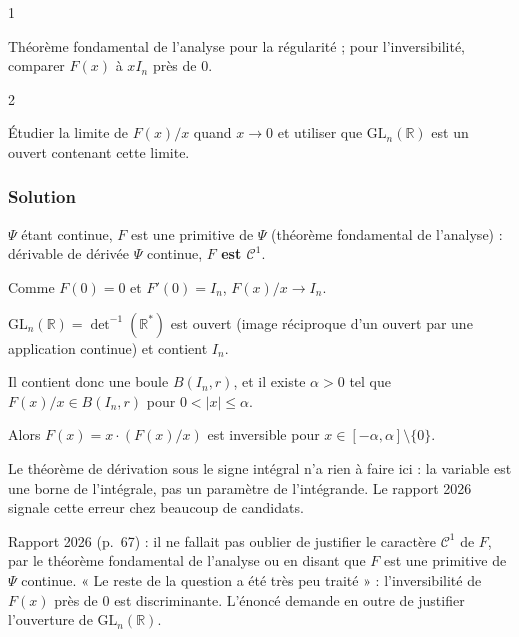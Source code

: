 \documentclass[11pt,a4paper]{article}
\begin{document}
\begin{indication}{1}

Théorème fondamental de l'analyse pour la régularité ; pour l'inversibilité, comparer \(F(x)\) à \(xI_n\) près de 0.

\end{indication}

\begin{indication}{2}

Étudier la limite de \(F(x)/x\) quand \(x\to0\) et utiliser que \({\mathrm{GL}}_n(\mathbb{R})\) est un ouvert contenant cette limite.

\end{indication}

\hypertarget{solution-20}{%
\subsubsection{Solution}\label{solution-20}}

\(\Psi\) étant continue, \(F\) est une primitive de \(\Psi\) (théorème fondamental de l'analyse) : dérivable de dérivée \(\Psi\) continue, \textbf{\(F\) est \({\mathcal{C}}^1\)}.

Comme \(F(0)=0\) et \(F'(0)=I_n\), \(F(x)/x\to I_n\).

\({\mathrm{GL}}_n(\mathbb{R})=\det^{-1}({\mathbb{R}}^*)\) est ouvert (image réciproque d'un ouvert par une application continue) et contient \(I_n\).

Il contient donc une boule \(B(I_n,r)\), et il existe \(\alpha>0\) tel que \(F(x)/x\in B(I_n,r)\) pour \(0<|x|\le\alpha\).

Alors \(F(x)=x\cdot(F(x)/x)\) est inversible pour \(x\in[-\alpha,\alpha]\setminus\{0\}\).

\begin{piege}

Le théorème de dérivation sous le signe intégral n'a rien à faire ici : la variable est une borne de l'intégrale, pas un paramètre de l'intégrande. Le rapport 2026 signale cette erreur chez beaucoup de candidats.

\end{piege}

\begin{jury}

Rapport 2026 (p.~67) : il ne fallait pas oublier de justifier le caractère \({\mathcal{C}}^1\) de \(F\), par le théorème fondamental de l'analyse ou en disant que \(F\) est une primitive de \(\Psi\) continue. « Le reste de la question a été très peu traité » : l'inversibilité de \(F(x)\) près de 0 est discriminante. L'énoncé demande en outre de justifier l'ouverture de \({\mathrm{GL}}_n(\mathbb{R})\).

\end{jury}
\end{document}
